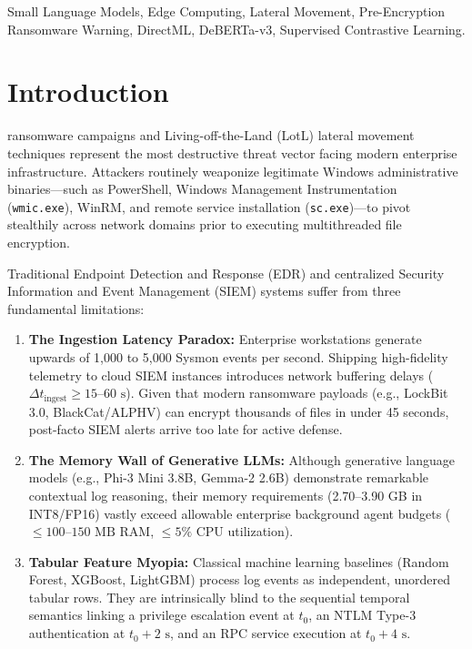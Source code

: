 \documentclass[10pt,journal,compsoc]{IEEEtran}
\begin{document}
{\begin{IEEEkeywords}
Small Language Models, Edge Computing, Lateral Movement, Pre-Encryption Ransomware Warning, DirectML, DeBERTa-v3, Supervised Contrastive Learning.
\end{IEEEkeywords}}

\maketitle
\IEEEdisplaynontitleabstractindextext
\IEEEpeerreviewmaketitle

\section{Introduction}
 ransomware campaigns and Living-off-the-Land (LotL) lateral movement techniques represent the most destructive threat vector facing modern enterprise infrastructure. Attackers routinely weaponize legitimate Windows administrative binaries---such as PowerShell, Windows Management Instrumentation (\texttt{wmic.exe}), WinRM, and remote service installation (\texttt{sc.exe})---to pivot stealthily across network domains prior to executing multithreaded file encryption.

Traditional Endpoint Detection and Response (EDR) and centralized Security Information and Event Management (SIEM) systems suffer from three fundamental limitations:
\begin{enumerate}
    \item \textbf{The Ingestion Latency Paradox:} Enterprise workstations generate upwards of 1,000 to 5,000 Sysmon events per second. Shipping high-fidelity telemetry to cloud SIEM instances introduces network buffering delays ($\Delta t_{\text{ingest}} \ge 15\text{--}60\text{ s}$). Given that modern ransomware payloads (e.g., LockBit 3.0, BlackCat/ALPHV) can encrypt thousands of files in under 45 seconds, post-facto SIEM alerts arrive too late for active defense.
    \item \textbf{The Memory Wall of Generative LLMs:} Although generative language models (e.g., Phi-3 Mini 3.8B, Gemma-2 2.6B) demonstrate remarkable contextual log reasoning, their memory requirements (2.70--3.90 GB in INT8/FP16) vastly exceed allowable enterprise background agent budgets ($\le 100\text{--}150\text{ MB RAM}$, $\le 5\%$ CPU utilization).
    \item \textbf{Tabular Feature Myopia:} Classical machine learning baselines (Random Forest, XGBoost, LightGBM) process log events as independent, unordered tabular rows. They are intrinsically blind to the sequential temporal semantics linking a privilege escalation event at $t_0$, an NTLM Type-3 authentication at $t_0 + 2\text{ s}$, and an RPC service execution at $t_0 + 4\text{ s}$.
\end{enumerate}
\end{document}

